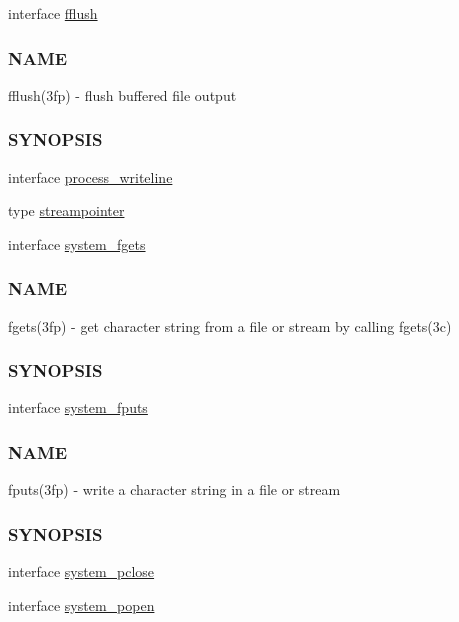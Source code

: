 \begin{DoxyCompactItemize}
\item 
interface \mbox{\hyperlink{interfacem__process_1_1fflush}{fflush}}
\begin{DoxyCompactList}\small\item\em \subsubsection*{N\+A\+ME}

fflush(3fp) -\/ flush buffered file output \subsubsection*{S\+Y\+N\+O\+P\+S\+IS}\end{DoxyCompactList}\item 
interface \mbox{\hyperlink{interfacem__process_1_1process__writeline}{process\+\_\+writeline}}
\item 
type \mbox{\hyperlink{structm__process_1_1streampointer}{streampointer}}
\item 
interface \mbox{\hyperlink{interfacem__process_1_1system__fgets}{system\+\_\+fgets}}
\begin{DoxyCompactList}\small\item\em \subsubsection*{N\+A\+ME}

fgets(3fp) -\/ get character string from a file or stream by calling fgets(3c) \subsubsection*{S\+Y\+N\+O\+P\+S\+IS}\end{DoxyCompactList}\item 
interface \mbox{\hyperlink{interfacem__process_1_1system__fputs}{system\+\_\+fputs}}
\begin{DoxyCompactList}\small\item\em \subsubsection*{N\+A\+ME}

fputs(3fp) -\/ write a character string in a file or stream \subsubsection*{S\+Y\+N\+O\+P\+S\+IS}\end{DoxyCompactList}\item 
interface \mbox{\hyperlink{interfacem__process_1_1system__pclose}{system\+\_\+pclose}}
\item 
interface \mbox{\hyperlink{interfacem__process_1_1system__popen}{system\+\_\+popen}}
\end{DoxyCompactItemize}
